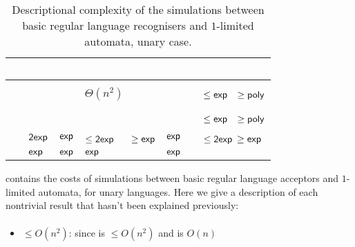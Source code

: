 \begin{table}
	\centering
	\renewcommand{\arraystretch}{1.2}
	\renewcommand{\hstdef}{.55}
	\begin{tabular}{|l|l|l|p{4.3em}|l|l|p{3.1em}|}
		\hline
		~     & \ODFA           & \ONFA           & \TDFA                                            & \TNFA   & \OLA   & \ODLA                          \\ \hline
		\ODFA & \cY             & \Ctriv          & \Ctriv                                           & \Ctriv  & \Ctriv & \Ctriv                         \\ \hline
		\ONFA & \rbt{$\CsubEq$} & \cY             & \cR $\Theta(n^2)$                                & \Ctriv  & \Ctriv & \cB $\le\Cexp\hst$ $\ge\Cpoly$ \\ \hline
		\TDFA & \rbt{$\CsubEq$} & \rbt{$\CsubEq$} & \cY                                              & \Ctriv  & \Ctriv & \Ctriv                         \\ \hline
		\TNFA & \rbt{$\CsubEq$} & \rbt{$\CsubEq$} & \cR \rbt[.4]{$\le\Csubln$} \rbt[.3]{$\ge\Cpoly$} & \cY     & \Ctriv & \cB $\le\Cexp\hst$ $\ge\Cpoly$ \\ \hline
		\OLA  & $\Cdexp$        & $\Cexp$         & \cG $\le\Cdexp\hst[1.25]$ $\ge\Cexp$             & $\Cexp$ & \cY    & \cG $\le\Cdexp$ $\ge\Cexp$     \\ \hline
		\ODLA & $\Cexp$         & $\Cexp$         & $\Cexp$                                          & $\Cexp$ & \Ctriv & \cY                            \\ \hline
	\end{tabular}
	\caption{Descriptional complexity of the simulations between basic regular language recognisers and $1$-limited automata, unary case.}
	\label{tab:sims-1la-unary}
\end{table}

 contains the costs of simulations between basic regular language acceptors and $1$-limited automata, for unary languages.
Here we give a description of each nontrivial result that hasn't been explained previously:

\paragraph{\ONFA{}\tto\ODLA}\label{cost:1NFAto1DLAu}
\begin{itemize}
	\item $\le O(n^2)$: since \hyperref[cost:1NFAto2DFAu]{\ONFA{}\tto\TDFA} is $\le O(n^2)$ and \TDFA{}\tto\ODLA is $O(n)$
\end{itemize}

